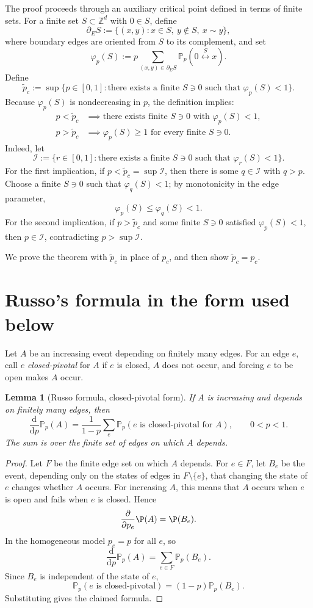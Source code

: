\documentclass[11pt]{article}
\newtheorem{lemma}{Lemma}
\newcommand{\Z}{\mathbb Z}
\newcommand{\Pp}{\mathbb P_p}
\newcommand{\dd}{\mathrm d}
\newcommand{\conn}{\longleftrightarrow}
\newcommand{\phip}{\varphi_p}
\newcommand{\pct}{\widetilde p_c}
\begin{document}
The proof proceeds through an auxiliary critical point defined in terms of finite sets.
For a finite set $S\subset\Z^d$ with $0\in S$, define
\[
 \partial_E S:=\{(x,y):x\in S,\ y\notin S,\ x\sim y\},
\]
where boundary edges are oriented from $S$ to its complement, and set
\[
 \phip(S)
 :=
 p\sum_{(x,y)\in\partial_E S}
 \Pp(0\stackrel{S}{\conn}x).
\]
Define
\[
 \pct:=\sup\bigl\{p\in[0,1]:\text{there exists a finite }S\ni 0\text{ such that }\phip(S)<1\bigr\}.
\]
Because $\phip(S)$ is nondecreasing in $p$, the definition implies:
\begin{align}
 p<\pct
 &\implies \text{there exists finite }S\ni0\text{ with }\phip(S)<1, \label{eq:below-ptilde}\\
 p>\pct
 &\implies \phip(S)\ge 1\text{ for every finite }S\ni0. \label{eq:above-ptilde}
\end{align}
Indeed, let
\[
 \mathcal I:=\bigl\{r\in[0,1]:\text{there exists a finite }S\ni0\text{ such that }\varphi_r(S)<1\bigr\}.
\]
For the first implication, if $p<\pct=\sup\mathcal I$, then there is some $q\in\mathcal I$ with $q>p$. Choose a finite $S\ni0$ such that $\varphi_q(S)<1$; by monotonicity in the edge parameter,
\[
 \varphi_p(S)\le \varphi_q(S)<1.
\]
For the second implication, if $p>\pct$ and some finite $S\ni0$ satisfied $\varphi_p(S)<1$, then $p\in\mathcal I$, contradicting $p>\sup\mathcal I$.

We prove the theorem with $\pct$ in place of $p_c$, and then show $\pct=p_c$.

\section{Russo's formula in the form used below}

Let $A$ be an increasing event depending on finitely many edges. For an edge $e$, call $e$ \emph{closed-pivotal} for $A$ if $e$ is closed, $A$ does not occur, and forcing $e$ to be open makes $A$ occur.

\begin{lemma}[Russo formula, closed-pivotal form]
If $A$ is increasing and depends on finitely many edges, then
\[
 \frac{\dd}{\dd p}\Pp(A)
 =
 \frac1{1-p}\sum_e
 \Pp(e\text{ is closed-pivotal for }A),
 \qquad 0<p<1.
\]
The sum is over the finite set of edges on which $A$ depends.
\end{lemma}

\begin{proof}
Let $F$ be the finite edge set on which $A$ depends. For $e\in F$, let $B_e$ be the event, depending only on the states of edges in $F\setminus\{e\}$, that changing the state of $e$ changes whether $A$ occurs. For increasing $A$, this means that $A$ occurs when $e$ is open and fails when $e$ is closed. Hence
\[
 \frac{\partial}{\partial p_e}\P(A)=\P(B_e).
\]
In the homogeneous model $p_e=p$ for all $e$, so
\[
 \frac{\dd}{\dd p}\Pp(A)=\sum_{e\in F}\Pp(B_e).
\]
Since $B_e$ is independent of the state of $e$,
\[
 \Pp(e\text{ is closed-pivotal})=(1-p)\Pp(B_e).
\]
Substituting gives the claimed formula.
\end{proof}
\end{document}
